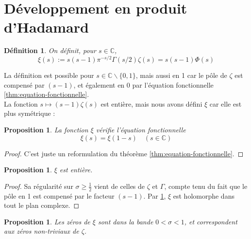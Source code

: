 \documentclass[french]{report}
\newtheorem{definition}[theorem]{Définition}
\newtheorem{proposition}[theorem]{Proposition}
\begin{document}
\section{Développement en produit d'Hadamard}

\begin{definition}
  On définit, pour $s\in\mathbb{C}$,
  \[
    \xi(s)
    := s(s-1)\pi^{-s/2}\Gamma(s/2)\zeta(s)
    = s(s-1)\Phi(s)
  \]
\end{definition}

La définition est possible pour $s\in\mathbb{C}\backslash\{0,1\}$, mais aussi en 1 car le pôle de $\zeta$ est compensé par $(s-1)$, et également en 0 par l'équation fonctionnelle \ref{thm:equation-fonctionnelle}.
\\

La fonction $s\mapsto(s-1)\zeta(s)$ est entière, mais nous avons défini $\xi$ car elle est plus symétrique :

\begin{proposition}\label{prop:xi-equation-fonctionnelle}
  La fonction $\xi$ vérifie l'équation fonctionnelle
  \[ \xi(s) = \xi(1-s)\quad (s\in\mathbb{C}) \]
\end{proposition}

\begin{proof}
  C'est juste un reformulation du théorème \ref{thm:equation-fonctionnelle}.
\end{proof}

\begin{proposition}
  $\xi$ est entière.
\end{proposition}

\begin{proof}
  Sa régularité sur $\sigma\geq\frac{1}{2}$ vient de celles de $\zeta$ et $\Gamma$, compte tenu du fait que le pôle en 1 est compensé par le facteur $(s-1)$. Par \ref{prop:xi-equation-fonctionnelle}, $\xi$ est holomorphe dans tout le plan complexe.
\end{proof}

\begin{proposition}
  Les zéros de $\xi$ sont dans la bande $0<\sigma<1$, et correspondent aux zéros non-triviaux de $\zeta$.
\end{proposition}
\end{document}

